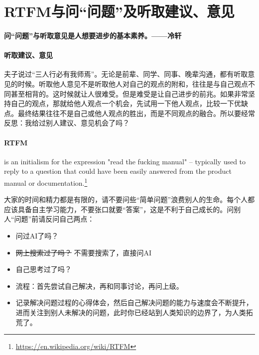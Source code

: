 \documentclass[cn,11pt,chinese,twoside]{elegantbook}
\begin{document}
\section*{RTFM与问“问题”及听取建议、意见}
\paragraph{问“问题”与听取意见是人想要进步的基本素养。——冷轩}

\paragraph{听取建议、意见}
夫子说过“三人行必有我师焉”。无论是前辈、同学、同事、晚辈沟通，都有听取意见的时候。听取他人意见不是听取他人对自己的观点的附和，往往是与自己观点不同甚至相背的。这时候就让人很难受。但是难受是让自己进步的前兆。如果非常坚持自己的观点，那就给他人观点一个机会，先试用一下他人观点，比较一下优缺点。最终结果往往不是自己或他人观点的胜出，而是不同观点的融合。所以要经常反思：我给过别人建议、意见机会了吗？

\paragraph{RTFM} is an initialism for the expression "read the fucking manual" – typically used to reply to a question that could have been easily answered from the product manual or documentation.\footnote{\url{https://en.wikipedia.org/wiki/RTFM}}

大家的时间和精力都是有限的，请不要问些“简单问题”浪费别人的生命。每个人都应该具备自主学习能力，不要张口就要“答案”，这是不利于自己成长的。问别人“问题”前请反问自己两点：
\begin{itemize}
\item 问过AI了吗？
\item \sout{网上搜索过了吗？} 不需要搜索了，直接问AI
\item 自己思考过了吗？
\item 流程：首先尝试自己解决，再和同事讨论，再问上级。
\item 记录解决问题过程的心得体会，然后自己解决问题的能力与速度会不断提升，进而关注到别人未解决的问题，此时你已经站到人类知识的边界了，为人类拓荒了。
\end{itemize}
\end{document}
